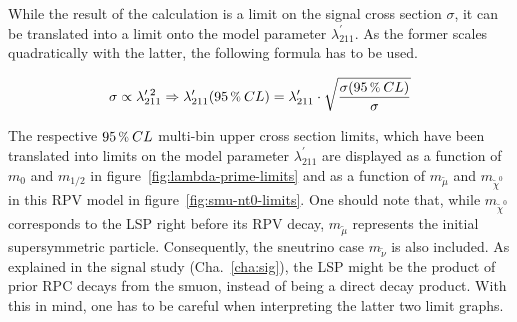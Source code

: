 While the result of the calculation is a limit on the signal cross section $\sigma$, it can be translated into a limit onto the model parameter $\lambda^\prime_{211}$. As the former scales quadratically with the latter, the following formula has to be used.

\begin{equation}
  \label{eq:xs-lambda-scale}
  \sigma \propto \lambda^{\prime\:2}_{211} \Rightarrow \lambda^\prime_{211} (95\,\pct\: CL) = \lambda^\prime_{211} \cdot \sqrt{ \frac{\sigma (95\,\pct\: CL)}{\sigma} } 
\end{equation}

The respective $95\,\pct\: CL$ multi-bin upper cross section limits, which have been translated into limits on the model parameter $\lambda^{\prime}_{211}$ are displayed as a function of $m_0$ and $m_{1/2}$ in figure~\ref{fig:lambda-prime-limits} and as a function of $m_{\tilde{\mu}}$ and $m_{\tilde{\chi}^0}$ in this RPV model in figure~\ref{fig:smu-nt0-limits}. One should note that, while $m_{\tilde{\chi}^0}$ corresponds to the LSP right before its RPV decay, $m_{\tilde{\mu}}$ represents the initial supersymmetric particle. Consequently, the sneutrino case $m_{\tilde{\nu}}$ is also included. As explained in the signal study (Cha.~\ref{cha:sig}), the LSP might be the product of prior RPC decays from the smuon, instead of being a direct decay product. With this in mind, one has to be careful when interpreting the latter two limit graphs.


